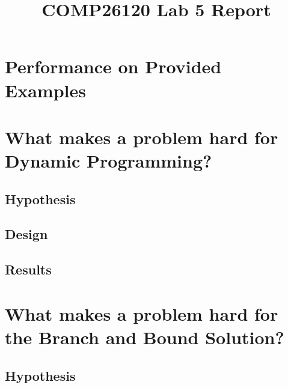 \documentclass[a4]{article}
\title{COMP26120 Lab 5 Report}
\author{}
\begin{document}
\maketitle

\section{Performance on Provided Examples}





\section{What makes a problem hard for Dynamic Programming?}

\subsection{Hypothesis}
\subsection{Design}
\subsection{Results}

\section{What makes a problem hard for the Branch and Bound Solution?}

\subsection{Hypothesis}
\end{document}
